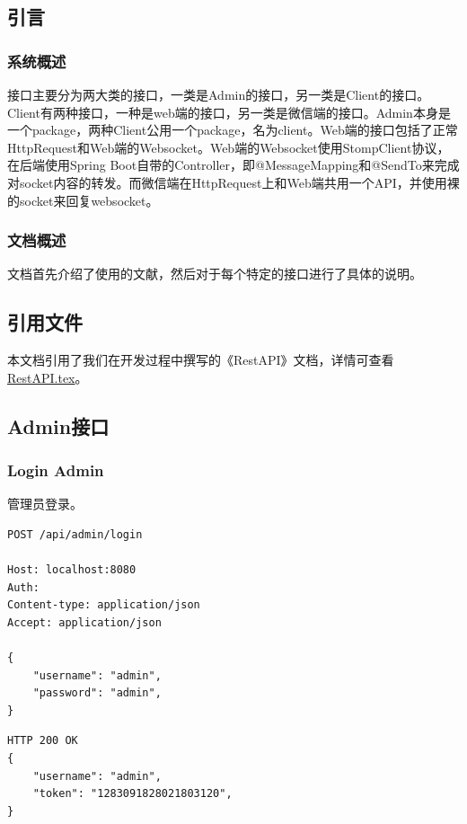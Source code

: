\documentclass[12pt, a4paper,UTF8]{article}
\begin{document}
		\subsection{引言}
			\subsubsection{系统概述}
				接口主要分为两大类的接口，一类是Admin的接口，另一类是Client的接口。Client有两种接口，一种是web端的接口，另一类是微信端的接口。Admin本身是一个package，两种Client公用一个package，名为client。Web端的接口包括了正常HttpRequest和Web端的Websocket。Web端的Websocket使用StompClient协议，在后端使用Spring Boot自带的Controller，即@MessageMapping和@SendTo来完成对socket内容的转发。而微信端在HttpRequest上和Web端共用一个API，并使用裸的socket来回复websocket。
			\subsubsection{文档概述}
				文档首先介绍了使用的文献，然后对于每个特定的接口进行了具体的说明。
		\subsection{引用文件}
			本文档引用了我们在开发过程中撰写的《RestAPI》文档，详情可查看\href{https://github.com/wenj/tomatodesign/blob/master/REST%20API.tex}{RestAPI.tex}。

		\subsection{Admin接口}

\subsubsection{Login Admin}
管理员登录。

\begin{lstlisting}
POST /api/admin/login

Host: localhost:8080
Auth:
Content-type: application/json
Accept: application/json

{
    "username": "admin",
    "password": "admin",
}
\end{lstlisting}

\begin{lstlisting}
HTTP 200 OK
{
    "username": "admin",
    "token": "1283091828021803120",
}

\end{lstlisting}
\end{document}
